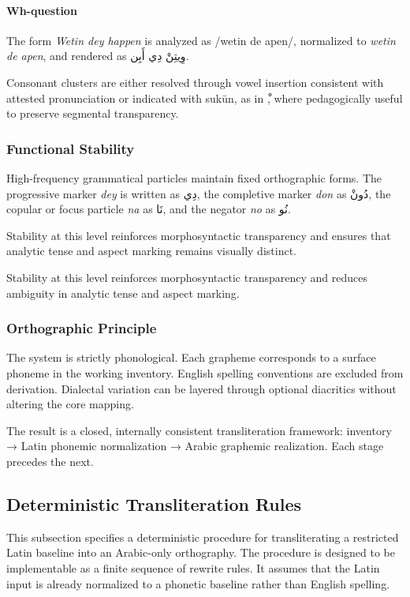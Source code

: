 \documentclass[12pt]{article}
\newcommand{\AR}[1]{\foreignlanguage{arabic}{#1}}
\begin{document}
\paragraph{Wh-question}

The form \textit{Wetin dey happen} is analyzed as /wetin de apen/, normalized to \textit{wetin de apen}, and rendered as \AR{وِيتِنْ دِي أَبِن}.

Consonant clusters are either resolved through vowel insertion consistent with attested pronunciation or indicated with sukūn, as in \AR{ْ}, where pedagogically useful to preserve segmental transparency.

\subsubsection{Functional Stability}

High-frequency grammatical particles maintain fixed orthographic forms. The progressive marker \textit{dey} is written as \AR{دِي}, the completive marker \textit{don} as \AR{دُونْ}, the copular or focus particle \textit{na} as \AR{نَا}, and the negator \textit{no} as \AR{نُو}. 

Stability at this level reinforces morphosyntactic transparency and ensures that analytic tense and aspect marking remains visually distinct.

Stability at this level reinforces morphosyntactic transparency and reduces ambiguity in analytic tense and aspect marking.

\subsubsection{Orthographic Principle}

The system is strictly phonological. Each grapheme corresponds to a surface phoneme in the working inventory. English spelling conventions are excluded from derivation. Dialectal variation can be layered through optional diacritics without altering the core mapping.

The result is a closed, internally consistent transliteration framework: inventory → Latin phonemic normalization → Arabic graphemic realization. Each stage precedes the next.

\subsection{Deterministic Transliteration Rules}

This subsection specifies a deterministic procedure for transliterating a restricted Latin baseline into an Arabic-only orthography. The procedure is designed to be implementable as a finite sequence of rewrite rules. It assumes that the Latin input is already normalized to a phonetic baseline rather than English spelling.
\end{document}
